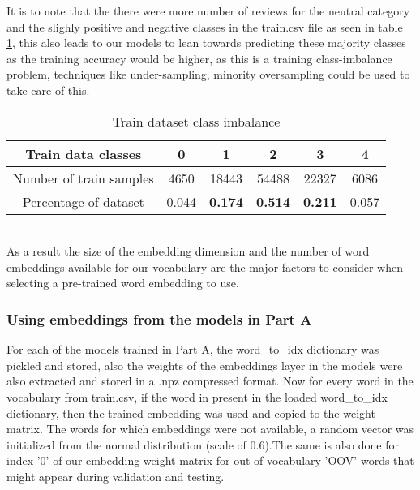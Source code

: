 \documentclass{article}
\begin{document}
\noindent
It is to note that the there were more number of reviews for the neutral category and the slighly positive and negative classes in the train.csv file as seen in table \ref{tab:dataset_imbalance}, this also leads to our models to lean towards predicting these majority classes as the training accuracy would be higher, as this is a training class-imbalance problem, techniques like under-sampling, minority oversampling could be used to take care of this.
\begin{table}[h!]
\begin{center}
\begin{tabular}{ |c|c|c|c|c|c|} 
 \hline
 Train data classes  & 0 & 1 & 2 & 3 & 4\\ 
 \hline \hline
Number of train samples & 4650 & 18443 & 54488 & 22327 & 6086\\ 
\hline
Percentage of dataset & 0.044 &\textbf{0.174} & \textbf{0.514} &\textbf{0.211} &0.057 \\

\hline
\end{tabular}
\caption{Train dataset class imbalance }
\label{tab:dataset_imbalance}
\end{center}
\end{table}
\\

\noindent
As a result the size of the embedding dimension and the number of word embeddings available for our vocabulary are the major factors to consider when selecting a pre-trained word embedding to use.



\subsubsection*{Using embeddings from the models in Part A}

For each of the models trained in Part A, the word\_to\_idx dictionary was pickled and stored, also the weights of the embeddings layer in the models were also extracted and stored in a .npz compressed format. Now for every word in the vocabulary from train.csv, if the word in present in the loaded word\_to\_idx dictionary, then the trained embedding was used and copied to the weight matrix. The words for which embeddings were not available, a random vector was initialized from the normal distribution (scale of 0.6).The same is also done for index ’0’ of our embedding weight matrix for out of vocabulary 'OOV' words that might appear during validation and testing.\\
\end{document}
